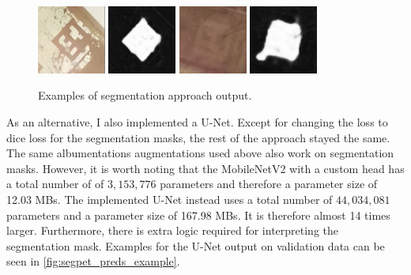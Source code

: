 \documentclass[10pt]{book}
\newcommand{\figureref}[1]{\autoref{#1}}
\begin{document}
\begin{figure}
  \centering
     {\includegraphics[width=0.2\textwidth]{image/segpet_1_in}}
     {\includegraphics[width=0.2\textwidth]{image/segpet_1_pred}}
     {\includegraphics[width=0.2\textwidth]{image/segpet_3_in}}
     {\includegraphics[width=0.2\textwidth]{image/segpet_3_pred}}
  \caption{Examples of segmentation approach output.}
  \label{fig:segpet_preds_example}
\end{figure}

As an alternative, I also implemented a U-Net. Except for changing the loss to dice loss for the segmentation masks, the rest of the approach stayed the same. The same albumentations augmentations used above also work on segmentation masks. However, it is worth noting that the MobileNetV2 with a custom head has a total number of of $3,153,776$ parameters and therefore a parameter size of 12.03 \acp{MB}. The implemented U-Net instead uses a total number of $44,034,081$ parameters and a parameter size of 167.98 \acp{MB}. It is therefore almost 14 times larger. Furthermore, there is extra logic required for interpreting the segmentation mask. 
Examples for the U-Net output on validation data can be seen in \figureref{fig:segpet_preds_example}. 
\end{document}
